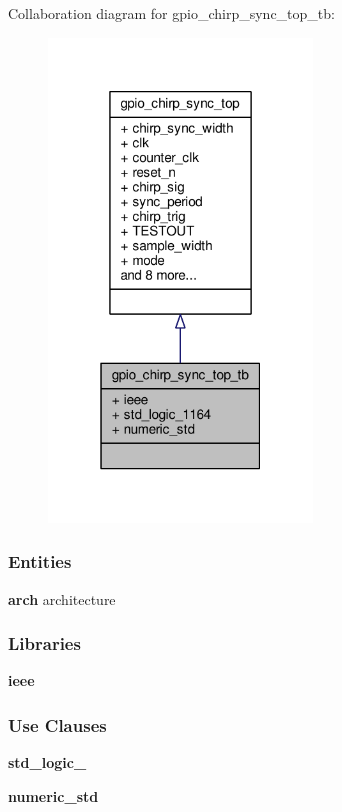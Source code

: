 Collaboration diagram for gpio\+\_\+chirp\+\_\+sync\+\_\+top\+\_\+tb\+:\nopagebreak
\begin{figure}[H]
\begin{center}
\leavevmode
\includegraphics[width=199pt]{df/d2e/classgpio__chirp__sync__top__tb__coll__graph}
\end{center}
\end{figure}
\subsubsection*{Entities}
\begin{DoxyCompactItemize}
\item 
{\bf arch} architecture
\end{DoxyCompactItemize}
\subsubsection*{Libraries}
 \begin{DoxyCompactItemize}
\item 
{\bf ieee} 
\end{DoxyCompactItemize}
\subsubsection*{Use Clauses}
 \begin{DoxyCompactItemize}
\item 
{\bf std\+\_\+logic\+\_}   
\item 
{\bf numeric\+\_\+std}   
\end{DoxyCompactItemize}


